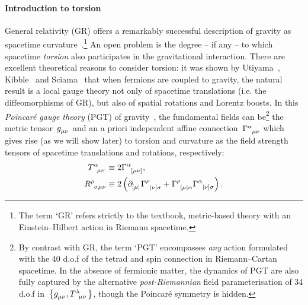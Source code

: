 \documentclass[aps,prd,reprint,preprintnumbers,showpacs,floatfix,nofootinbib,superscript address]{revtex4-2}
\begin{document}
\paragraph*{Introduction to torsion} General relativity (GR) offers a remarkably successful description of gravity as spacetime curvature~\cite{Einstein:1915}.\footnote{The term `GR' refers strictly to the textbook, metric-based theory with an Einstein--Hilbert action in Riemann spacetime.} An open problem is the degree -- if any -- to which spacetime \emph{torsion} also participates in the gravitational interaction. There are excellent theoretical reasons to consider torsion: it was shown by Utiyama~\cite{Utiyama:1956sy}, Kibble~\cite{Kibble:1961ba} and Sciama~\cite{Sciama:1962} that when fermions are coupled to gravity, the natural result is a local gauge theory not only of spacetime translations (i.e. the diffeomorphisms of GR), but also of spatial rotations and Lorentz boosts. In this \emph{Poincar\'e gauge theory} (PGT) of gravity~\cite{Blagojevic:2002}, the fundamental fields can be\footnote{By contrast with GR, the term `PGT' encompasses \emph{any} action formulated with the 40 d.o.f of the tetrad and spin connection in Riemann--Cartan spacetime. In the absence of fermionic matter, the dynamics of PGT are also fully captured by the alternative \emph{post-Riemannian} field parameterisation of 34 d.o.f in~$\big\{\FieldG{_{\mu\nu}},\MAGT{^\lambda_{\mu\nu}}\big\}$, though the Poincar\'e symmetry is hidden.} the metric tensor~$\FieldG{_{\mu\nu}}$ and an a priori independent affine connection~$\MAGA{^\alpha_{\mu}_{\nu}}$ which gives rise (as we will show later) to torsion and curvature as the field strength tensors of spacetime translations and rotations, respectively:
\begin{subequations}
\begin{align}
	\MAGT{^\alpha_\mu_\nu}&\equiv 2\MAGA{^\alpha_{[\mu}_{\nu]}},\label{ECTorsion}\\
	\MAGF{^\rho_\sigma_{\mu\nu}}&\equiv 2\left(\PD{_{[\mu|}}\MAGA{^\rho_{|\nu]}_\sigma}+\MAGA{^\rho_{[\mu|}_\alpha}\MAGA{^\alpha_{|\nu]}_\sigma}\right).\label{ECCurvature}
\end{align}
\end{subequations}
\end{document}
